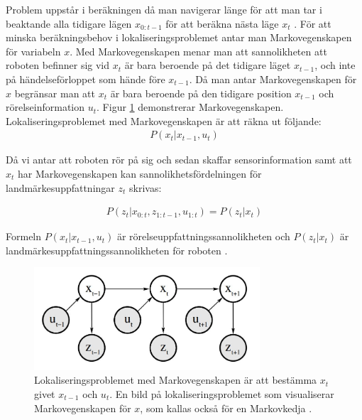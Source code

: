 Problem uppstår i beräkningen då man navigerar länge för att man tar i beaktande alla tidigare lägen $x_{0:t-1}$ för att beräkna nästa läge $x_t$ \citep{ProbabilisticRobotics}. För att minska beräkningsbehov i lokaliseringsproblemet antar man Markovegenskapen för variabeln $x$. Med Markovegenskapen menar man att sannolikheten att roboten befinner sig vid $x_t$ är bara beroende på det tidigare läget $x_{t-1}$, och inte på händelseförloppet som hände före $x_{t-1}$. Då man antar Markovegenskapen för $x$ begränsar man att $x_t$ är bara beroende på den tidigare position $x_{t-1}$ och rörelseinformation $u_t$. Figur \ref{markov} demonstrerar Markovegenskapen. Lokaliseringsproblemet med Markovegenskapen är att räkna ut följande:
\begin{align}
    P( x_t | x_{t-1}, u_{t})
\end{align}

Då vi antar att roboten rör på sig och sedan skaffar sensorinformation samt att $x_t$ har Markovegenskapen kan sannolikhetsfördelningen för landmärkesuppfattningar $z_t$ skrivas:

\begin{align}
    P(z_t | x_{0:t}, z_{1:t-1}, u_{1:t}) = P(z_t|x_t)
\end{align}

Formeln $P(x_t|x_{t-1}, u_{t})$ är rörelseuppfattningssannolikheten och $P(z_t|x_t)$ är landmärkesuppfattningssannolikheten för roboten \citep{ProbabilisticRobotics}. 

\begin{figure}[ht]
    \begin{center}
    \includegraphics[width=0.75\textwidth]{markov.JPG}
    \caption{Lokaliseringsproblemet med Markovegenskapen är att bestämma $x_t$ givet $x_{t-1}$ och $u_t$. En bild på lokaliseringsproblemet som visualiserar Markovegenskapen för $x$, som kallas också för en Markovkedja \citep{ProbabilisticRobotics}.}
    \label{markov}
    \end{center}
\end{figure}

